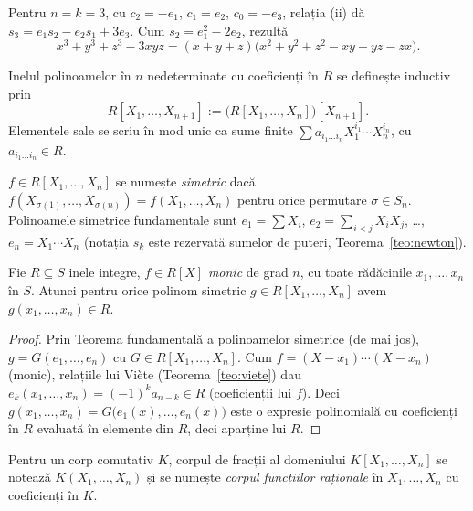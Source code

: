 \begin{aplicatie}\label{apl:treicuburi}
Pentru $n=k=3$, cu $c_2=-e_1$, $c_1=e_2$, $c_0=-e_3$, relația (ii) dă $s_3=e_1s_2-e_2s_1+3e_3$. Cum $s_2=e_1^2-2e_2$, rezultă
\[
x^3+y^3+z^3-3xyz=(x+y+z)\bigl(x^2+y^2+z^2-xy-yz-zx\bigr).
\]
\end{aplicatie}

\begin{definitie}
Inelul polinoamelor în $n$ nedeterminate cu coeficienți în $R$ se definește inductiv prin
\[
R[X_1,\dots,X_{n+1}]:=\big(R[X_1,\dots,X_n]\big)[X_{n+1}].
\]
Elementele sale se scriu în mod unic ca sume finite $\sum a_{i_1\dots i_n}X_1^{i_1}\cdots X_n^{i_n}$, cu $a_{i_1\dots i_n}\in R$.
\end{definitie}

\begin{definitie}
$f\in R[X_1,\dots,X_n]$ se numește \emph{simetric} dacă $f(X_{\sigma(1)},\dots,X_{\sigma(n)})=f(X_1,\dots,X_n)$ pentru orice permutare $\sigma\in S_n$. Polinoamele simetrice fundamentale sunt $e_1=\sum X_i$, $e_2=\sum_{i<j}X_iX_j$, \dots, $e_n=X_1\cdots X_n$ (notația $s_k$ este rezervată sumelor de puteri, Teorema~\ref{teo:newton}).
\end{definitie}

\begin{propozitie}\label{prop:simroots}
Fie $R\subseteq S$ inele integre, $f\in R[X]$ \emph{monic} de grad $n$, cu toate rădăcinile $x_1,\dots,x_n$ în $S$. Atunci pentru orice polinom simetric $g\in R[X_1,\dots,X_n]$ avem $g(x_1,\dots,x_n)\in R$.
\end{propozitie}
\begin{proof}
Prin Teorema fundamentală a polinoamelor simetrice (de mai jos), $g=G(e_1,\dots,e_n)$ cu $G\in R[X_1,\dots,X_n]$. Cum $f=(X-x_1)\cdots(X-x_n)$ (monic), relațiile lui Viète (Teorema~\ref{teo:viete}) dau $e_k(x_1,\dots,x_n)=(-1)^k a_{n-k}\in R$ (coeficienții lui $f$). Deci $g(x_1,\dots,x_n)=G\big(e_1(x),\dots,e_n(x)\big)$ este o expresie polinomială cu coeficienți în $R$ evaluată în elemente din $R$, deci aparține lui $R$.
\end{proof}

\begin{definitie}
Pentru un corp comutativ $K$, corpul de fracții al domeniului $K[X_1,\dots,X_n]$ se notează $K(X_1,\dots,X_n)$ și se numește \emph{corpul funcțiilor raționale} în $X_1,\dots,X_n$ cu coeficienți în $K$.
\end{definitie}


